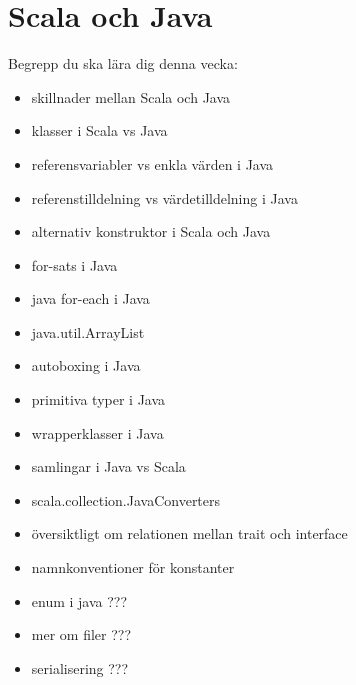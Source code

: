 \chapter{Scala och Java}\label{chapter:W11}
Begrepp du ska lära dig denna vecka:
\begin{itemize}[noitemsep,label={$\square$},leftmargin=*]
\item skillnader mellan Scala och Java
\item klasser i Scala vs Java
\item referensvariabler vs enkla värden i Java
\item referenstilldelning vs värdetilldelning i Java
\item alternativ konstruktor i Scala och Java
\item for-sats i Java
\item java for-each i Java
\item java.util.ArrayList
\item autoboxing i Java
\item primitiva typer i Java
\item wrapperklasser i Java
\item samlingar i Java vs Scala
\item scala.collection.JavaConverters
\item översiktligt om relationen mellan trait och interface
\item namnkonventioner för konstanter
\item enum i java ???
\item mer om filer ???
\item serialisering ???\end{itemize}
